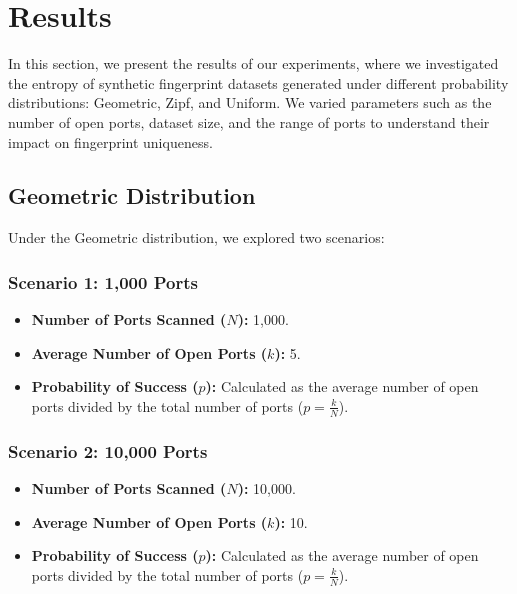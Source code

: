 
\section{Results}

In this section, we present the results of our experiments, where we investigated the entropy of synthetic fingerprint datasets generated under different probability distributions: Geometric, Zipf, and Uniform. We varied parameters such as the number of open ports, dataset size, and the range of ports to understand their impact on fingerprint uniqueness.

\subsection{Geometric Distribution}

Under the Geometric distribution, we explored two scenarios:

\subsubsection{Scenario 1: 1,000 Ports}

\begin{itemize}
\item \textbf{Number of Ports Scanned (\(N\)):} 1,000.
\item \textbf{Average Number of Open Ports (\(k\)):} 5.
\item \textbf{Probability of Success (\(p\)):} Calculated as the average number of open ports divided by the total number of ports (\(p = \frac{k}{N}\)).
\end{itemize}

\subsubsection{Scenario 2: 10,000 Ports}

\begin{itemize}
\item \textbf{Number of Ports Scanned (\(N\)):} 10,000.
\item \textbf{Average Number of Open Ports (\(k\)):} 10.
\item \textbf{Probability of Success (\(p\)):} Calculated as the average number of open ports divided by the total number of ports (\(p = \frac{k}{N}\)).
\end{itemize}

